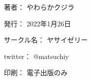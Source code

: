 \clearpage
{}
\begin{flushright}
\begin{minipage}{0.5\hsize}
\begin{description}
  \item{著者：} やわらかクジラ
  \item{発行：} 2022年1月26日
  \item{サークル名：} ヤサイゼリー
  \item{twitter：} @matsuchiy
  \item{印刷：} 電子出版のみ
\end{description}
\end{minipage}
\end{flushright}
\clearpage